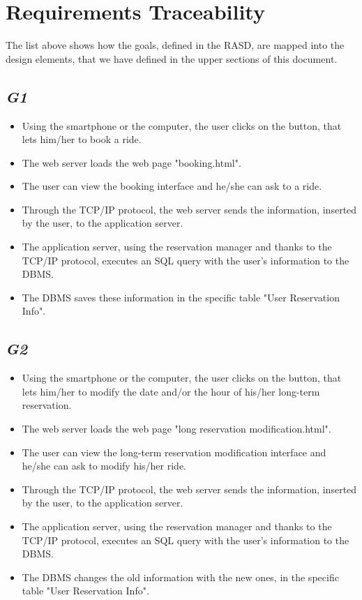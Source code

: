 \section{Requirements Traceability}
The list above shows how the goals, defined in the RASD, are mapped into the design elements, that we have defined in the upper sections of this document.
\newline
\newline
	\subsection {\emph{G1}}
		\begin{itemize}
			\item Using the smartphone or the computer, the user clicks on the button, that lets him/her to book a ride.
			\item The web server loads the web page "booking.html".
			\item The user can view the booking interface and he/she can ask to a ride.
			\item Through the TCP/IP protocol, the web server sends the information, inserted by the user, to the application server.
			\item The application server, using the reservation manager and thanks to the TCP/IP protocol, executes an SQL query with the user's information to the DBMS.
			\item The DBMS saves these information in the specific table "User Reservation Info".
		\end{itemize}
	\subsection {\emph{G2}}
		\begin{itemize}
			\item Using the smartphone or the computer, the user clicks on the button, that lets him/her to modify the date and/or the hour of his/her long-term reservation.
			\item The web server loads the web page "long reservation modification.html".
			\item The user can view the long-term reservation modification interface and he/she can ask to modify his/her ride.
			\item Through the TCP/IP protocol, the web server sends the information, inserted by the user, to the application server.
			\item The application server, using the reservation manager and thanks to the TCP/IP protocol, executes an SQL query with the user's information to the DBMS.
			\item The DBMS changes the old information with the new ones, in the specific table "User Reservation Info".
		\end{itemize}
